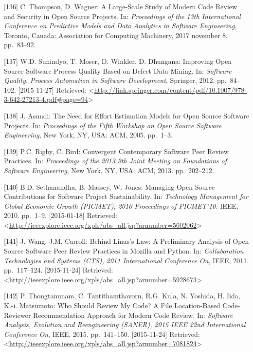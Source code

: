 \documentclass[12pt,magyar,a4paper,oneside]{scrreprt}
\newenvironment{cslreferences}%
  {}%
  {\par}
\begin{document}
\begin{cslreferences}
\leavevmode\hypertarget{ref-thompson_large-scale_2017}{}%
{[}136{]} C. Thompson, D. Wagner: A Large-Scale Study of Modern Code
Review and Security in Open Source Projects. In: \emph{Proceedings of
the 13th International Conference on Predictive Models and Data
Analytics in Software Engineering}, Toronto, Canada: Association for
Computing Machinery, 2017 november 8. pp.~83--92.

\leavevmode\hypertarget{ref-sunindyo_improving_2012}{}%
{[}137{]} W.D. Sunindyo, T. Moser, D. Winkler, D. Dhungana: Improving
Open Source Software Process Quality Based on Defect Data Mining. In:
\emph{Software Quality. Process Automation in Software Development},
Springer, 2012. pp.~84--102. {[}2015-11-27{]} Retrieved:
\textless{}\url{http://link.springer.com/content/pdf/10.1007/978-3-642-27213-4.pdf\#page=94}\textgreater{}

\leavevmode\hypertarget{ref-asundi_need_2005}{}%
{[}138{]} J. Asundi: The Need for Effort Estimation Models for Open
Source Software Projects. In: \emph{Proceedings of the Fifth Workshop on
Open Source Software Engineering}, New York, NY, USA: ACM, 2005.
pp.~1--3.

\leavevmode\hypertarget{ref-rigby_convergent_2013}{}%
{[}139{]} P.C. Rigby, C. Bird: Convergent Contemporary Software Peer
Review Practices. In: \emph{Proceedings of the 2013 9th Joint Meeting on
Foundations of Software Engineering}, New York, NY, USA: ACM, 2013.
pp.~202--212.

\leavevmode\hypertarget{ref-sethanandha_managing_2010}{}%
{[}140{]} B.D. Sethanandha, B. Massey, W. Jones: Managing Open Source
Contributions for Software Project Sustainability. In: \emph{Technology
Management for Global Economic Growth (PICMET), 2010 Proceedings of
PICMET'10:} IEEE, 2010. pp.~1--9. {[}2015-01-18{]} Retrieved:
\textless{}\url{http://ieeexplore.ieee.org/xpls/abs_all.jsp?arnumber=5602062}\textgreater{}

\leavevmode\hypertarget{ref-wang_behind_2011}{}%
{[}141{]} J. Wang, J.M. Carroll: Behind Linus's Law: A Preliminary
Analysis of Open Source Software Peer Review Practices in Mozilla and
Python. In: \emph{Collaboration Technologies and Systems (CTS), 2011
International Conference On}, IEEE, 2011. pp.~117--124. {[}2015-11-24{]}
Retrieved:
\textless{}\url{http://ieeexplore.ieee.org/xpls/abs_all.jsp?arnumber=5928673}\textgreater{}

\leavevmode\hypertarget{ref-thongtanunam_who_2015}{}%
{[}142{]} P. Thongtanunam, C. Tantithamthavorn, R.G. Kula, N. Yoshida,
H. Iida, K.-i. Matsumoto: Who Should Review My Code? A File
Location-Based Code-Reviewer Recommendation Approach for Modern Code
Review. In: \emph{Software Analysis, Evolution and Reengineering
(SANER), 2015 IEEE 22nd International Conference On}, IEEE, 2015.
pp.~141--150. {[}2015-11-24{]} Retrieved:
\textless{}\url{http://ieeexplore.ieee.org/xpls/abs_all.jsp?arnumber=7081824}\textgreater{}


\end{cslreferences}
\end{document}
